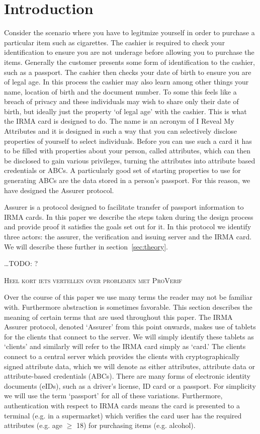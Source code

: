 \chapter{Introduction}
Consider the scenario where you have to legitmize yourself in order to purchase a particular item such as cigarettes. The cashier is required to check your identification to ensure you are not underage before allowing you to purchase the items. Generally the customer presents some form of identification to the cashier, such as a passport. The cashier then checks your date of birth to ensure you are of legal age. In this process the cashier may also learn among other things your name, location of birth and the document number. To some this feels like a breach of privacy and these individuals may wish to share only their date of birth, but ideally just the property `of legal age' with the cashier. This is what the IRMA card is designed to do. The name is an acronym of I Reveal My Attributes and it is designed in such a way that you can selectively disclose properties of yourself to select individuals. Before you can use such a card it has to be filled with properties about your person, called attributes, which can then be disclosed to gain various privileges, turning the attributes into attribute based credentials or ABCs. A particularly good set of starting properties to use for generating ABCs are the data stored in a person's passport. For this reason, we have designed the Assurer protocol.

Assurer is a protocol designed to facilitate transfer of passport information to IRMA cards. In this paper we describe the steps taken during the design process and provide proof it satisfies the goals set out for it. In this protocol we identify three actors: the assurer, the verification and issuing server and the IRMA card. We will describe these further in section~\ref{sec:theory}.

\ldots \textsc{TODO: ?}

\textsc{Heel kort iets vertellen over problemen met ProVerif}

Over the course of this paper we use many terms the reader may not be familiar with. Furthermore abstraction is sometimes favorable. This section describes the meaning of certain terms that are used throughout this paper. The IRMA Assurer protocol, denoted `Assurer' from this point onwards, makes use of tablets for the clients that connect to the server. We will simply identify these tablets as `clients' and similarly will refer to the IRMA card simply as `card.' The clients connect to a central server which provides the clients with cryptographically signed attribute data, which we will denote as either attributes, attribute data or attribute-based credentials (ABCs). There are many forms of electronic identity documents (eIDs), such as a driver's license, ID card or a passport. For simplicity we will use the term `passport' for all of these variations. Furthermore, authentication with respect to IRMA cards means the card is presented to a terminal (e.g. in a supermarket) which verifies the card user has the required attributes (e.g. age $\geq$ 18) for purchasing items (e.g. alcohol).

